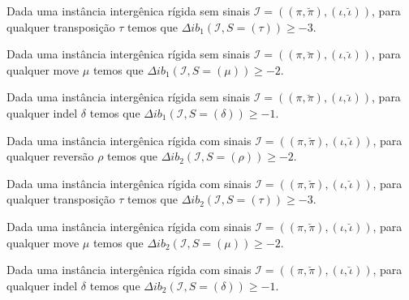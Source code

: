 \begin{lemma}\label{lemma:IUJZCMMV}
Dada uma instância intergênica rígida sem sinais $\mathcal{I}=((\pi,\breve\pi),(\iota,\breve\iota))$, para qualquer transposição $\tau$ temos que $\Delta ib_1(\mathcal{I}, S = (\tau)) \ge -3$.
\end{lemma}

\begin{lemma}\label{lemma:SYXLGTAP}
Dada uma instância intergênica rígida sem sinais $\mathcal{I}=((\pi,\breve\pi),(\iota,\breve\iota))$, para qualquer move $\mu$ temos que $\Delta ib_1(\mathcal{I}, S = (\mu)) \ge -2$.
\end{lemma}

\begin{lemma}\label{lemma:KWIVENLG}
Dada uma instância intergênica rígida sem sinais $\mathcal{I}=((\pi,\breve\pi),(\iota,\breve\iota))$, para qualquer indel $\delta$ temos que $\Delta ib_1(\mathcal{I}, S = (\delta)) \ge -1$.
\end{lemma}

\begin{lemma}\label{lemma:IKBNJWMY}
Dada uma instância intergênica rígida com sinais $\mathcal{I}=((\pi,\breve\pi),(\iota,\breve\iota))$, para qualquer reversão $\rho$ temos que $\Delta ib_2(\mathcal{I}, S = (\rho)) \ge -2$.
\end{lemma}

\begin{lemma}\label{lemma:MYVALTSG}
Dada uma instância intergênica rígida com sinais $\mathcal{I}=((\pi,\breve\pi),(\iota,\breve\iota))$, para qualquer transposição $\tau$ temos que $\Delta ib_2(\mathcal{I}, S = (\tau)) \ge -3$.
\end{lemma}

\begin{lemma}\label{lemma:LSPSMYMM}
Dada uma instância intergênica rígida com sinais $\mathcal{I}=((\pi,\breve\pi),(\iota,\breve\iota))$, para qualquer move $\mu$ temos que $\Delta ib_2(\mathcal{I}, S = (\mu)) \ge -2$.
\end{lemma}

\begin{lemma}\label{lemma:KXIYYHHL}
Dada uma instância intergênica rígida com sinais $\mathcal{I}=((\pi,\breve\pi),(\iota,\breve\iota))$, para qualquer indel $\delta$ temos que $\Delta ib_2(\mathcal{I}, S = (\delta)) \ge -1$.
\end{lemma}

